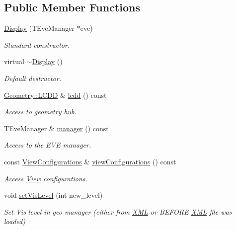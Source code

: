 \subsection*{Public Member Functions}
\begin{DoxyCompactItemize}
\item 
\hyperlink{class_d_d4hep_1_1_display_a9038e67619d22b62a928fa32d912ea10}{Display} (T\+Eve\+Manager $\ast$eve)
\begin{DoxyCompactList}\small\item\em Standard constructor. \end{DoxyCompactList}\item 
virtual \hyperlink{class_d_d4hep_1_1_display_ac2607a6bb236c55547a4223d40d85d1f}{$\sim$\+Display} ()
\begin{DoxyCompactList}\small\item\em Default destructor. \end{DoxyCompactList}\item 
\hyperlink{class_d_d4hep_1_1_geometry_1_1_l_c_d_d}{Geometry\+::\+L\+C\+DD} \& \hyperlink{class_d_d4hep_1_1_display_a3cb697a04f6da762bb0f7801e33c590e}{lcdd} () const
\begin{DoxyCompactList}\small\item\em Access to geometry hub. \end{DoxyCompactList}\item 
T\+Eve\+Manager \& \hyperlink{class_d_d4hep_1_1_display_aab28a35f743661ba4f81856ffd22934a}{manager} () const
\begin{DoxyCompactList}\small\item\em Access to the E\+VE manager. \end{DoxyCompactList}\item 
const \hyperlink{class_d_d4hep_1_1_display_a1bb7fbc1eeb22ef2b1cea35c78e9d27a}{View\+Configurations} \& \hyperlink{class_d_d4hep_1_1_display_a7c390acfafb0d019021f2e0aaa7ff828}{view\+Configurations} () const
\begin{DoxyCompactList}\small\item\em Access \hyperlink{class_d_d4hep_1_1_view}{View} configurations. \end{DoxyCompactList}\item 
void \hyperlink{class_d_d4hep_1_1_display_a57cf9b4b15b4627ac264bc95583ace91}{set\+Vis\+Level} (int new\+\_\+level)
\begin{DoxyCompactList}\small\item\em Set Vis level in geo manager (either from \hyperlink{namespace_d_d4hep_1_1_x_m_l}{X\+ML} or B\+E\+F\+O\+RE \hyperlink{namespace_d_d4hep_1_1_x_m_l}{X\+ML} file was loaded) \end{DoxyCompactList}\item 

\end{DoxyCompactItemize}
